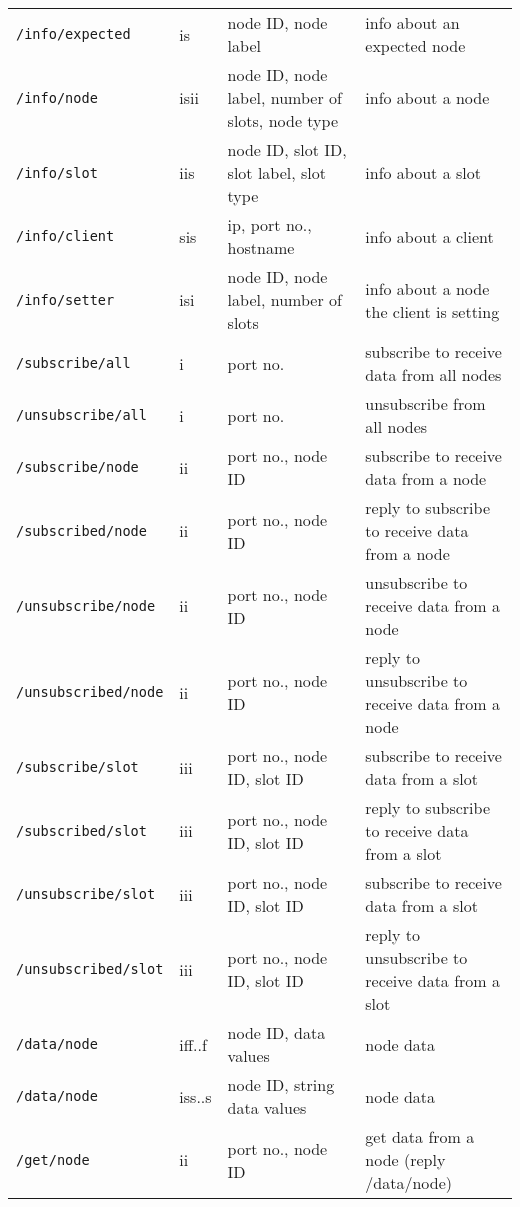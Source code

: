 \documentclass[letterpaper,10pt]{article}
\begin{document}
\begin{sidewaystable}[!tbp]
\begin{center}
\begin{tabular}{|llll|}
\verb|/info/expected| & is & node ID, node label & info about an expected node \\
\verb|/info/node| & isii & node ID, node label, number of slots, node type & info about a node \\
\verb|/info/slot| & iis & node ID, slot ID, slot label, slot type & info about a slot \\
\verb|/info/client| & sis & ip, port no., hostname & info about a client \\
\verb|/info/setter| & isi & node ID, node label, number of slots & info about a node the client is setting \\

\verb|/subscribe/all| & i & port no. & subscribe to receive data from all nodes \\
\verb|/unsubscribe/all| & i & port no. & unsubscribe from all nodes \\

\verb|/subscribe/node| & ii & port no., node ID & subscribe to receive data from a node \\
\verb|/subscribed/node| & ii & port no., node ID & reply to subscribe to receive data from a node \\

\verb|/unsubscribe/node| & ii & port no., node ID & unsubscribe to receive data from a node \\
\verb|/unsubscribed/node| & ii & port no., node ID & reply to unsubscribe to receive data from a node \\

\verb|/subscribe/slot| & iii & port no., node ID, slot ID & subscribe to receive data from a slot \\  
\verb|/subscribed/slot| & iii & port no., node ID, slot ID & reply to subscribe to receive data from a slot \\  

\verb|/unsubscribe/slot| & iii & port no., node ID, slot ID & subscribe to receive data from a slot \\  
\verb|/unsubscribed/slot| & iii & port no., node ID, slot ID & reply to unsubscribe to receive data from a slot \\  

\verb|/data/node| & iff..f & node ID, data values & node data \\
\verb|/data/node| & iss..s & node ID, string data values & node data \\
\verb|/get/node| & ii & port no., node ID & get data from a node (reply /data/node) \\


\end{tabular}
\end{center}
\end{sidewaystable}
\end{document}
